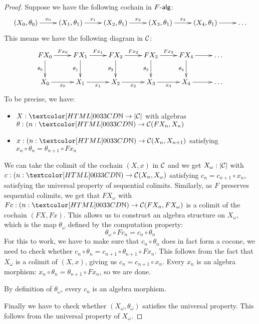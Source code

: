 \begin{proof}
  Suppose we have the following cochain in $\algcat{F}$:
  $$
  \xymatrix{
    (X_0,\theta_0) \ar[r]^{x_0}
    &(X_1,\theta_1) \ar[r]^{x_1} 
    &(X_2,\theta_1) \ar[r]^{x_2} 
    &(X_3,\theta_1) \ar[r]^{x_3}
    &(X_4,\theta_1) \ar[r]
    &\hdots
  }
  $$
  This means we have the following diagram in $\mathcal{C}$:
  $$
  \xymatrix{
    F X_0 \ar[r]^{F x_0} \ar[d]_{\theta_0}
    &F X_1 \ar[r]^{F x_1} \ar[d]_{\theta_1}
    &F X_2 \ar[r]^{F x_2} \ar[d]_{\theta_2}
    &F X_3 \ar[r]^{F x_3} \ar[d]_{\theta_3}
    &F X_4 \ar[r] \ar[d]_{\theta_4} 
    &\hdots
    \\
    X_0 \ar[r]_{x_0}
    &X_1 \ar[r]_{x_1}
    &X_2 \ar[r]_{x_2}
    &X_3 \ar[r]_{x_3}
    &X_4 \ar[r]
    &\hdots
  }
  $$
  To be precise, we have:
  \begin{itemize}
  \item $X : \natty \to | \Cc |$ with algebras $\theta : (n : \natty) \to \Cc(F X_n, X_n)$
  \item $x : (n : \natty) \to \Cc(X_n,X_{n+1})$ satisfying $x_n \circ \theta_n = \theta_{n+1} \circ Fx_n$
  \end{itemize}

  We can take the colimit of the cochain $(X,x)$ in $\mathcal{C}$ and we get
  $X_{\omega} : | \mathcal{C} |$ with
  $c : (n : \natty) \to \Cc(X_n,X_{\omega})$ satisfying
  $c_n = c_{n+1} \circ x_n$, satisfying the universal property of
  sequential colimits. Similarly, as $F$ preserves sequential
  colimits, we get that $FX_{\omega}$ with
  $Fc : (n : \natty) \to \Cc(FX_n,FX_{\omega})$ is a colimit of the
  cochain $(FX,Fx)$. This allows us to construct an algebra structure
  on $X_{\omega}$, which is the map $\theta_{\omega}$ defined by the
  computation property:
  $$
  \theta_{\omega} \circ Fc_n = c_n \circ \theta_n
  $$
  For this to work, we have to make sure that $c_n \circ \theta_n$
  does in fact form a cocone, \ie we need to check whether
  $c_n \circ \theta_n = c_{n+1} \circ \theta_{n+1} \circ Fx_n$. This
  follows from the fact that $X_{\omega}$ is a colimit of $(X,x)$,
  giving us $c_n = c_{n+1} \circ x_n$. Every $x_n$ is an algebra
  morphism: $x_n \circ \theta_n = \theta_{n+1} \circ Fx_n$, so we are
  done.

  By definition of $\theta_{\omega}$, every $c_n$ is an algebra
  morphism.

  Finally we have to check whether $(X_{\omega},\theta_{\omega})$
  satisfies the universal property. This follows from the universal
  property of $X_{\omega}$.
\end{proof}

